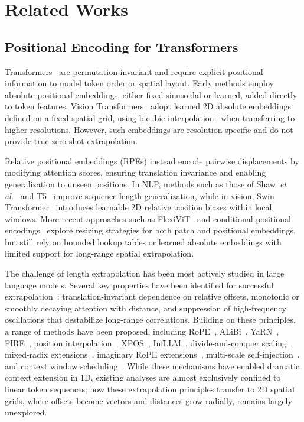 \section{Related Works}
\label{sec:related_work}

\subsection{Positional Encoding for Transformers}

Transformers~\cite{vaswani2017attention} are permutation-invariant and require explicit positional information to model token order or spatial layout. Early methods employ absolute positional embeddings, either fixed sinusoidal or learned, added directly to token features. Vision Transformers~\cite{dosovitskiy2021image} adopt learned 2D absolute embeddings defined on a fixed spatial grid, using bicubic interpolation~\cite{beyer2022better} when transferring to higher resolutions. However, such embeddings are resolution-specific and do not provide true zero-shot extrapolation.

Relative positional embeddings (RPEs) instead encode pairwise displacements by modifying attention scores, ensuring translation invariance and enabling generalization to unseen positions. In NLP, methods such as those of Shaw~\emph{et al.}~\cite{shaw2018self} and T5~\cite{raffel2020exploring} improve sequence-length generalization, while in vision, Swin Transformer~\cite{liu2021swin} introduces learnable 2D relative position biases within local windows. More recent approaches such as FlexiViT~\cite{beyer2023flexivit} and conditional positional encodings~\cite{chu2023conditional} explore resizing strategies for both patch and positional embeddings, but still rely on bounded lookup tables or learned absolute embeddings with limited support for long-range spatial extrapolation.

The challenge of length extrapolation has been most actively studied in large language models. Several key properties have been identified for successful extrapolation~\cite{hong2024token,dong2024exploring}: translation-invariant dependence on relative offsets, monotonic or smoothly decaying attention with distance, and suppression of high-frequency oscillations that destabilize long-range correlations. Building on these principles, a range of methods have been proposed, including RoPE~\cite{su2024roformer}, ALiBi~\cite{press2022train}, YaRN~\cite{peng2024yarn}, FIRE~\cite{li2024functional}, position interpolation~\cite{chen2024extending}, XPOS~\cite{sun2022length}, InfLLM~\cite{xiao2024infllm}, divide-and-conquer scaling~\cite{yang2025dcis}, mixed-radix extensions~\cite{tian2026mrrope}, imaginary RoPE extensions~\cite{liu2025beyond}, multi-scale self-injection~\cite{han2026stacked}, and context window scheduling~\cite{zhu2025skyladder}. While these mechanisms have enabled dramatic context extension in 1D, existing analyses are almost exclusively confined to linear token sequences; how these extrapolation principles transfer to 2D spatial grids, where offsets become vectors and distances grow radially, remains largely unexplored.


